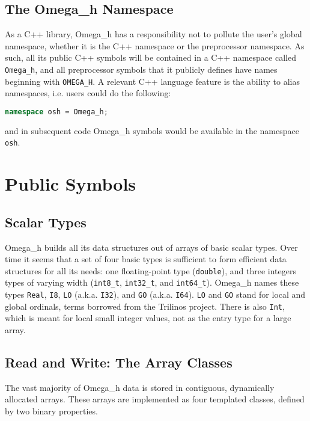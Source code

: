 \documentclass{article}
\begin{document}
\subsection{The Omega\_h Namespace}

As a C++ library, Omega\_h has a responsibility not to pollute
the user's global namespace, whether it is the C++ namespace
or the preprocessor namespace.
As such, all its public C++ symbols will be contained in a C++
namespace called \texttt{Omega\_h}, and all preprocessor
symbols that it publicly defines have names beginning with
\texttt{OMEGA\_H}.
A relevant C++ language feature is the ability to
alias namespaces, i.e. users could do the following:
\begin{lstlisting}[language=C++]
namespace osh = Omega_h;
\end{lstlisting}
and in subsequent code Omega\_h symbols would be available
in the namespace \texttt{osh}.

\section{Public Symbols}

\subsection{Scalar Types}
\label{sec:scalars}

Omega\_h builds all its data structures out of arrays
of basic scalar types.
Over time it seems that a set of four basic types
is sufficient to form efficient data structures
for all its needs: one floating-point type
(\texttt{double}), and three integers types
of varying width (\texttt{int8\_t}, 
\texttt{int32\_t}, and \texttt{int64\_t}).
Omega\_h names these types \texttt{Real},
\texttt{I8}, \texttt{LO} (a.k.a. \texttt{I32}),
and \texttt{GO} (a.k.a. \texttt{I64}).
\texttt{LO} and \texttt{GO} stand for local
and global ordinals, terms borrowed from
the Trilinos project.
There is also \texttt{Int}, which is meant for
local small integer values, not as the entry
type for a large array.

\subsection{Read and Write: The Array Classes}
\label{sec:rw}

The vast majority of Omega\_h data is stored in
contiguous, dynamically allocated arrays.
These arrays are implemented as four templated
classes, defined by two binary properties.
\end{document}
